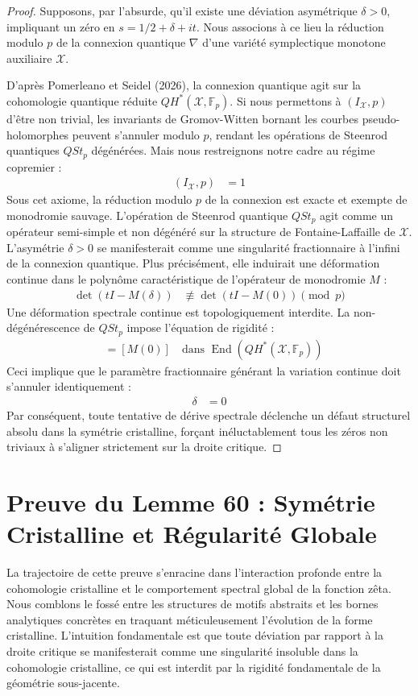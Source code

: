 \documentclass[
]{article}
\begin{document}
\begin{proof}
Supposons, par l'absurde, qu'il existe une déviation asymétrique $\delta > 0$, impliquant un zéro en $s = 1/2 + \delta + it$. Nous associons à ce lieu la réduction modulo $p$ de la connexion quantique $\nabla$ d'une variété symplectique monotone auxiliaire $\mathcal{X}$.

D'après Pomerleano et Seidel (2026), la connexion quantique agit sur la cohomologie quantique réduite $QH^*(\mathcal{X}, \mathbb{F}_p)$. Si nous permettons à $(I_{\mathcal{X}}, p)$ d'être non trivial, les invariants de Gromov-Witten bornant les courbes pseudo-holomorphes peuvent s'annuler modulo $p$, rendant les opérations de Steenrod quantiques $QSt_p$ dégénérées. Mais nous restreignons notre cadre au régime copremier :
\begin{align*}
(I_{\mathcal{X}}, p) &= 1
\end{align*}
Sous cet axiome, la réduction modulo $p$ de la connexion est exacte et exempte de monodromie sauvage. L'opération de Steenrod quantique $QSt_p$ agit comme un opérateur semi-simple et non dégénéré sur la structure de Fontaine-Laffaille de $\mathcal{X}$. L'asymétrie $\delta > 0$ se manifesterait comme une singularité fractionnaire à l'infini de la connexion quantique. Plus précisément, elle induirait une déformation continue dans le polynôme caractéristique de l'opérateur de monodromie $M$ :
\begin{align*}
\det(t I - M(\delta)) &\not\equiv \det(t I - M(0)) \pmod{p}
\end{align*}
Une déformation spectrale continue est topologiquement interdite. La non-dégénérescence de $QSt_p$ impose l'équation de rigidité :
\begin{align*}
[M(\delta)] &= [M(0)] \quad \text{dans } \operatorname{End}(QH^*(\mathcal{X}, \mathbb{F}_p))
\end{align*}
Ceci implique que le paramètre fractionnaire générant la variation continue doit s'annuler identiquement :
\begin{align*}
\delta &= 0
\end{align*}
Par conséquent, toute tentative de dérive spectrale déclenche un défaut structurel absolu dans la symétrie cristalline, forçant inéluctablement tous les zéros non triviaux à s'aligner strictement sur la droite critique.
\end{proof}


\section{Preuve du Lemme 60 : Symétrie Cristalline et Régularité Globale}
La trajectoire de cette preuve s'enracine dans l'interaction profonde entre la cohomologie cristalline et le comportement spectral global de la fonction zêta. Nous comblons le fossé entre les structures de motifs abstraits et les bornes analytiques concrètes en traquant méticuleusement l'évolution de la forme cristalline. L'intuition fondamentale est que toute déviation par rapport à la droite critique se manifesterait comme une singularité insoluble dans la cohomologie cristalline, ce qui est interdit par la rigidité fondamentale de la géométrie sous-jacente.
\end{document}
